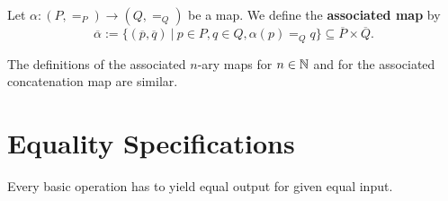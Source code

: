 \begin{definition}
 Let $\alpha: (P, =_P) \rightarrow (Q, =_Q)$ be a \GAP map. We define the \textbf{associated map} by
 \[
  \overline{\alpha} := \{ (\overline{p}, \overline{q}) ~|~ p \in P, q \in Q, \alpha( p ) =_{Q} q \} \subseteq \overline{P} \times \overline{Q}.
 \]
\end{definition}

The definitions of the associated $n$-ary maps for $n \in \mathbb{N}$ and for the associated concatenation map are similar.

\section{Equality Specifications}

\begin{specification}
 Every basic operation has to yield equal output for given equal input.
 \end{specification}

